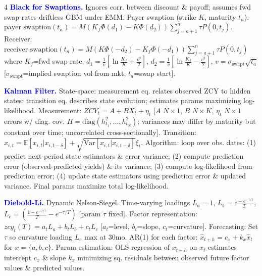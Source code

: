 \documentclass[landscape]{article}
\begin{document}
\begin{multicols}{4}
\textcolor{blue}{\textbf{Black for Swaptions.}} Ignores corr. between discount \& payoff; assumes fwd swap rates driftless GBM under EMM. Payer swaption (strike $K$, maturity $t_n$): $\text{payer swaption}(t_n)=M(K_f\Phi(d_1)-K\Phi(d_2))\sum_{j=a+1}^n\tau P(0,t_j)$. Receiver: $\text{receiver swaption}(t_n)=M(K\Phi(-d_2)-K_f\Phi(-d_1))\sum_{j=a+1}^n\tau P(0,t_j)$ where $K_f$=fwd swap rate. $d_1=\frac{1}{v}[\ln\frac{K_f}{K}+\frac{v^2}{2}]$, $d_2=\frac{1}{v}[\ln\frac{K_f}{K}-\frac{v^2}{2}]$, $v=\sigma_{\text{swapt}}\sqrt{t_a}$ [$\sigma_{\text{swapt}}$=implied swaption vol from mkt, $t_a$=swap start].

\textcolor{blue}{\textbf{Kalman Filter.}} State-space: measurement eq. relates observed ZCY to hidden states; transition eq. describes state evolution; estimates params maximizing log-likelihood. Measurement: $ZCY_t=A+BX_t+\eta_t$ [$A$ $N\times 1$, $B$ $N\times K$, $\eta_t$ $N\times 1$ errors w/ diag. cov. $H=\text{diag}(h_{t_1}^2,\ldots,h_{t_N}^2)$; variances may differ by maturity but constant over time; uncorrelated cross-sectionally]. Transition: $x_{i,t}=\mathbb{E}[x_{i,t}|x_{i,t-\delta}]+\sqrt{\text{Var}[x_{i,t}|x_{i,t-\delta}]}\xi_t$. Algorithm: loop over obs. dates: (1) predict next-period state estimators \& error variance; (2) compute prediction error (observed-predicted yields) \& its variance; (3) compute log-likelihood from prediction error; (4) update state estimators using prediction error \& updated variance. Final params maximize total log-likelihood.

\textcolor{blue}{\textbf{Diebold-Li.}} Dynamic Nelson-Siegel. Time-varying loadings $L_a=1$, $L_b=\frac{1-e^{-\tau/\tau}}{T}$, $L_c=(\frac{1-e^{-\tau/\tau}}{T}-e^{-\tau/T})$ [param $\tau$ fixed]. Factor representation: $zcy_t(T)=a_t L_a+b_t L_b+c_t L_c$ [$a_t$=level, $b_t$=slope, $c_t$=curvature]. Forecasting: Set $\tau$ so curvature loading $L_c$ max at 30mo. AR(1) for each factor: $\hat{x}_{t+h}=c_x+k_x\hat{x}_t$ for $x=\{a,b,c\}$. Param estimation: OLS regression of $x_{t+h}$ on $x_t$ estimates intercept $c_x$ \& slope $k_x$ minimizing sq. residuals between observed future factor values \& predicted values.


\end{multicols}
\end{document}
